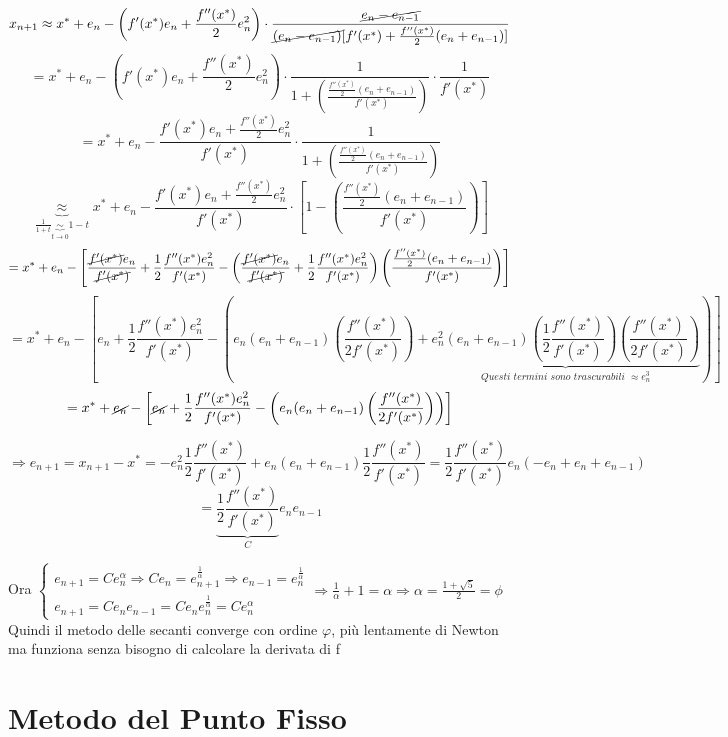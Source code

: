 \documentclass[12pt,a4paper]{article}
\begin{document}
\[x_{n+1} \approx x^* + e_n - \left( f'(x^*) e_n + \frac{f''(x^*)}{2} e_n^2 \right) \cdot \frac{\cancel{e_n - e_{n-1}}}{\cancel{(e_n - e_{n-1})}[f'(x^*) + \frac{f''(x^*)}{2}(e_n + e_{n-1})]}\]
\[= x^* + e_n - \left( f'(x^*) e_n + \frac{f''(x^*)}{2} e_n^2 \right) \cdot \frac{1}{1 + \left( \frac{\frac{f''(x^*)}{2}(e_n + e_{n-1})}{f'(x^*)} \right)}\cdot\frac{1}{f'(x^*)}
\]
\[= x^* + e_n - \frac{ f'(x^*) e_n + \frac{f''(x^*)}{2} e_n^2}{f'(x^*)} \cdot \frac{1}{1 + \left( \frac{\frac{f''(x^*)}{2}(e_n + e_{n-1})}{f'(x^*)} \right)}\]
\[\underbrace{\approx}_{\frac{1}{1+t}\underbrace{\sim}_{t\to0}{1-t}} x^* + e_n - \frac{ f'(x^*) e_n + \frac{f''(x^*)}{2} e_n^2}{f'(x^*)} \cdot \left[
1 - \left( \frac{\frac{f''(x^*)}{2}(e_n + e_{n-1})}{f'(x^*)} \right)\right]\]
\[= x^*+e_n-\left[\frac{\cancel{f'(x^*)}e_n}{\cancel{f'(x^*)}}+\frac{1}{2}\frac{f''(x^*)e_n^2}{f'(x^*)}-\left(\frac{\cancel{f'(x^*)}e_n}{\cancel{f'(x^*)}}+\frac{1}{2}\frac{f''(x^*)e_n^2}{f'(x^*)}\right)\left( \frac{\frac{f''(x^*)}{2}(e_n + e_{n-1})}{f'(x^*)} \right)\right]\]
\[= x^*+e_n-\left[e_n+\frac{1}{2}\frac{f''(x^*)e_n^2}{f'(x^*)}-\left(e_n(e_n + e_{n-1})\left( \frac{f''(x^*)}{2f'(x^*)} \right)+\underbrace{e_n^2(e_n + e_{n-1})\left(\frac{1}{2}\frac{f''(x^*)}{f'(x^*)}\right)\left( \frac{f''(x^*)}{2f'(x^*)}\right)}_{\textit{Questi termini sono trascurabili }\approx e_n^3} \right)\right]\]
\[= x^*+\cancel{e_n}-\left[\cancel{e_n}+\frac{1}{2}\frac{f''(x^*)e_n^2}{f'(x^*)}-\left(e_n(e_n + e_{n-1})\left( \frac{f''(x^*)}{2f'(x^*)} \right) \right)\right]\]

\[\Rightarrow e_{n+1}=x_{n+1}-x^*= -e_n^2\frac{1}{2}\frac{f''(x^*)}{f'(x^*)}+e_n(e_n + e_{n-1})\frac{1}{2}\frac{f''(x^*)}{f'(x^*)}=\frac{1}{2}\frac{f''(x^*)}{f'(x^*)}e_n(-e_n+e_n+e_{n-1})\]
$$=\underbrace{\frac{1}{2}\frac{f''(x^*)}{f'(x^*)}}_{C}e_ne_{n-1}$$

Ora $\begin{cases}e_{n+1}=Ce_n^{\alpha}\Rightarrow Ce_n=e_{n+1}^{\frac{1}{\alpha}}\Rightarrow e_{n-1}=e_n^{\frac{1}{\alpha}}\\e_{n+1}=Ce_ne_{n-1}=Ce_ne_n^{\frac{1}{\alpha}}=Ce_n^\alpha\end{cases}\Rightarrow \frac{1}{\alpha}+1=\alpha\Rightarrow\alpha=\frac{1+\sqrt{5}}{2}=\phi$
Quindi il metodo delle secanti converge con ordine \(\varphi\), più lentamente di Newton ma funziona senza bisogno di calcolare la derivata di f

\newpage
\section*{Metodo del Punto Fisso}
\end{document}
